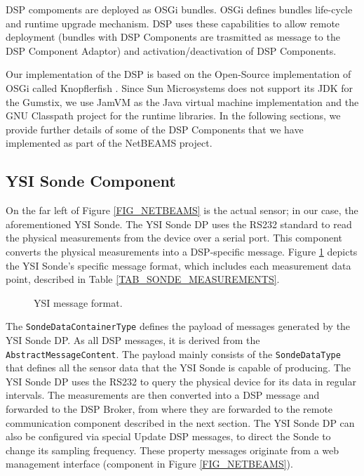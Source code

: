 \documentclass[conference]{IEEEtran}
\begin{document}
DSP compoments are deployed as OSGi bundles. OSGi defines bundles life-cycle and
runtime upgrade mechanism. DSP uses these capabilities to allow remote deployment 
(bundles with DSP Components are trasmitted as message to the DSP Component Adaptor) 
and activation/deactivation of DSP Components. 

Our implementation of the DSP is based on the Open-Source
implementation of OSGi called Knopflerfish \cite{knopflerfish01}.
Since Sun Microsystems does not support its JDK for the Gumstix, we
use JamVM \cite{jamvm01} as the Java virtual machine implementation
and the GNU Classpath \cite{classpath01} project for the runtime libraries. In
the following sections, we provide further details of some of the DSP
Components that we have implemented as part of the NetBEAMS project.

\subsection{YSI Sonde Component}

On the far left of Figure \ref{FIG_NETBEAMS} is the actual sensor; in
our case, the aforementioned YSI Sonde. The YSI Sonde DP 
uses the RS232 standard to read the physical measurements from the
device over a serial port.  This component converts the physical
measurements into a DSP-specific message. Figure
\ref{FIG_DSP_YSI_DATA} depicts the YSI Sonde's specific message format, 
which includes each measurement data point, described in Table
\ref{TAB_SONDE_MEASUREMENTS}.

\begin{figure}[!htb]
\centering
{}
\caption{\label{FIG_DSP_YSI_DATA} YSI message format.}
\end{figure}

The \texttt{SondeDataContainerType} defines the payload of messages generated
by the YSI Sonde DP. As all DSP messages, it is derived from the
\texttt{AbstractMessageContent}. The payload mainly consists of the
\texttt{SondeDataType} that defines all the sensor data that the YSI Sonde is
capable of producing. The YSI Sonde DP uses the RS232 to query the
physical device for its data in regular intervals. The measurements
are then converted into a DSP message and forwarded to the DSP Broker,
from where they are forwarded to the remote communication component
described in the next section.  The YSI Sonde DP can also be
configured via special Update DSP messages, to direct the Sonde to change its
sampling frequency.  These property messages originate from a web
management interface (component  in Figure \ref{FIG_NETBEAMS}).
\end{document}
